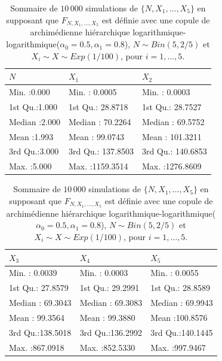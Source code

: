 \documentclass{article}
\begin{document}
		\begin{table}[H]
			\centering
			\begin{tabular}{lll}
				\hline
				      $N$ &       $X_1$ &       $X_2$  \\ 
				\hline
				 Min.   :0.000   & Min.   :   0.0005   & Min.   :   0.0003    \\ 
				 1st Qu.:1.000   & 1st Qu.:  28.8718   & 1st Qu.:  28.7527      \\ 
				 Median :2.000   & Median :  70.2264   & Median :  69.5752     \\ 
				 Mean   :1.993   & Mean   :  99.0743   & Mean   : 101.3211      \\ 
				 3rd Qu.:3.000   & 3rd Qu.: 137.8503   & 3rd Qu.: 140.6853     \\ 
				 Max.   :5.000   & Max.   :1159.3514   & Max.   :1276.8609     \\ 
				\hline
			\end{tabular}
			\begin{tabular}{lll}
				\hline
				       $X_3$ &      $X_4$&       $X_5$ \\ 
				\hline
				 Min.   :  0.0039   & Min.   :  0.0003   & Min.   :  0.0055   \\ 
				 1st Qu.: 27.8579   & 1st Qu.: 29.2991   & 1st Qu.: 28.8589   \\ 
				 Median : 69.3043   & Median : 69.3083   & Median : 69.9943   \\ 
				 Mean   : 99.3564   & Mean   : 99.3880   & Mean   :100.8576   \\ 
				 3rd Qu.:138.5018   & 3rd Qu.:136.2992   & 3rd Qu.:140.1445   \\ 
				 Max.   :867.0918   & Max.   :852.5330   & Max.   :997.9467   \\ 
				\hline
			\end{tabular}
		\caption[Sommaire des données simulées pour le scénario \ref{scenario_log_log}]{Sommaire de $10\,000$ simulations de $\{N, X_1, \dots, X_5\}$ en supposant que $F_{N,X_1,\dots, X_5}$ est définie avec une copule de archimédienne hiérarchique logarithmique-logarithmique($\alpha_0=0.5, \alpha_1=0.8$), $N \sim Bin(5, 2/5)$ et $X_i \sim X \sim Exp(1/100)$, pour $i=1,\dots, 5$.}
		\label{tbl_sommaire_log_log}
		\end{table}
	
\end{document}
